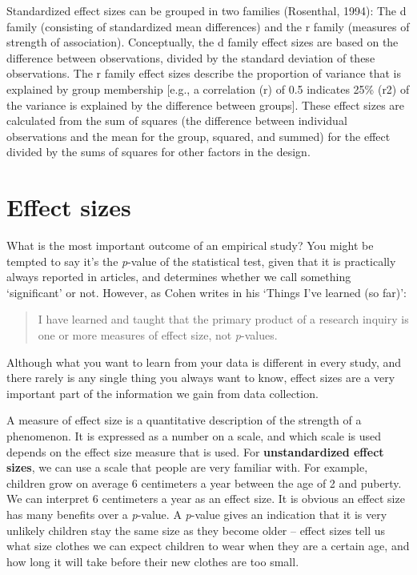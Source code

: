 \documentclass[
]{krantz}
\begin{document}
Standardized effect sizes can be grouped in two families (Rosenthal, 1994): The d family (consisting of standardized mean differences) and the r family (measures of strength of association). Conceptually, the d family effect sizes are based on the difference between observations, divided by the standard deviation of these observations. The r family effect sizes describe the proportion of variance that is explained by group membership {[}e.g., a correlation (r) of 0.5 indicates 25\% (r2) of the variance is explained by the difference between groups{]}. These effect sizes are calculated from the sum of squares (the difference between individual observations and the mean for the group, squared, and summed) for the effect divided by the sums of squares for other factors in the design.

\hypertarget{effect-sizes}{%
\section{Effect sizes}\label{effect-sizes}}

What is the most important outcome of an empirical study? You might be tempted to say it's the \emph{p}-value of the statistical test, given that it is practically always reported in articles, and determines whether we call something `significant' or not. However, as Cohen \citet{cohen_things_1990} writes in his `Things I've learned (so far)':

\begin{quote}
I have learned and taught that the primary product of a research inquiry is one or more measures of effect size, not \emph{p}-values.
\end{quote}

Although what you want to learn from your data is different in every study, and there rarely is any single thing you always want to know, effect sizes are a very important part of the information we gain from data collection.

A measure of effect size is a quantitative description of the strength of a phenomenon. It is expressed as a number on a scale, and which scale is used depends on the effect size measure that is used. For \textbf{unstandardized effect sizes}, we can use a scale that people are very familiar with. For example, children grow on average 6 centimeters a year between the age of 2 and puberty. We can interpret 6 centimeters a year as an effect size. It is obvious an effect size has many benefits over a \emph{p}-value. A \emph{p}-value gives an indication that it is very unlikely children stay the same size as they become older -- effect sizes tell us what size clothes we can expect children to wear when they are a certain age, and how long it will take before their new clothes are too small.
\end{document}
